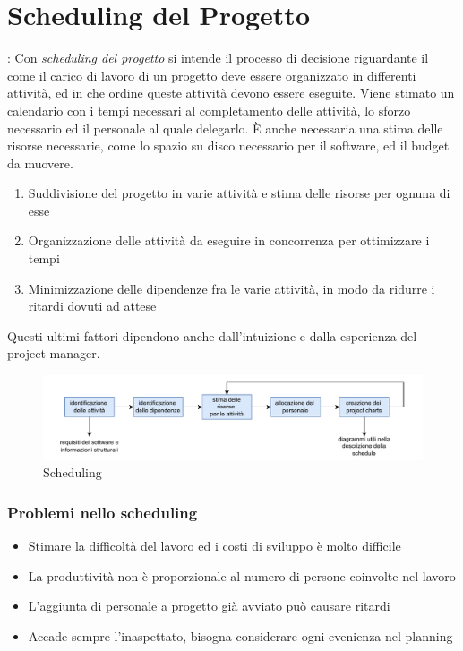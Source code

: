 \documentclass[10pt, letterpaper]{report}
\begin{document}
\section{Scheduling del Progetto}
 : Con \textit{scheduling del progetto} si intende il processo di decisione riguardante 
il come il carico di lavoro di un progetto deve essere organizzato in differenti attività, ed 
in che ordine queste attività devono essere eseguite.\acc 
Viene stimato un calendario con i tempi necessari al completamento delle attività, lo sforzo 
necessario ed il personale al quale delegarlo. È anche necessaria una stima delle risorse 
necessarie, come lo spazio su disco necessario per il software, ed il budget da 
muovere.\begin{enumerate}
    \item Suddivisione del progetto in varie attività e stima delle risorse per ognuna di esse 
    \item Organizzazione delle attività da eseguire in concorrenza per ottimizzare i tempi 
    \item Minimizzazione delle dipendenze fra le varie attività, in modo da ridurre i 
    ritardi dovuti ad attese 
\end{enumerate}
Questi ultimi fattori dipendono anche dall'intuizione e dalla esperienza del project manager.
\begin{center}
    \begin{figure}[h!]
        \centering 
        \includegraphics[width=1\textwidth ]{images/projectScheduling.pdf}
        \caption{Scheduling}
    \end{figure}\end{center}
\subsubsection{Problemi nello scheduling}\begin{itemize}
    \item Stimare la difficoltà del lavoro ed i costi di sviluppo è molto difficile 
    \item La produttività non è proporzionale al numero di persone coinvolte nel lavoro 
    \item L'aggiunta di personale a progetto già avviato può causare ritardi  
    \item Accade sempre l'inaspettato, bisogna considerare ogni evenienza nel planning
\end{itemize}
\end{document}
